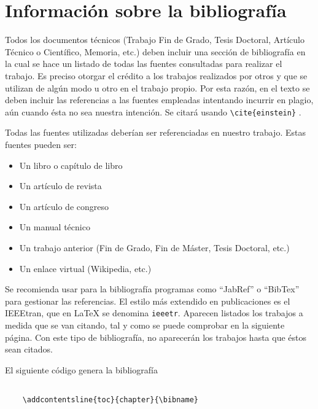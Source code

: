 \chapter*{Información sobre la bibliografía}
Todos los documentos técnicos (Trabajo Fin de Grado, Tesis Doctoral, Artículo Técnico o Científico, Memoria, etc.) deben incluir una sección de bibliografía en la cual se hace un listado de todas las fuentes consultadas para realizar el trabajo. Es preciso otorgar el crédito a los trabajos realizados por otros y que se utilizan de algún modo u otro en el trabajo propio. Por esta razón, en el texto se deben incluir las referencias a las fuentes empleadas intentando incurrir en plagio, aún cuando ésta no sea nuestra intención. Se citará usando \lstinline!\cite{einstein}! \cite{einstein}.


Todas las fuentes utilizadas deberían ser referenciadas en nuestro trabajo. Estas fuentes pueden ser:

\begin{itemize}
	\item Un libro o capítulo de libro
	\item Un artículo de revista
	\item Un artículo de congreso
	\item Un manual técnico
	\item Un trabajo anterior (Fin de Grado, Fin de Máster, Tesis Doctoral, etc.)
	\item Un enlace virtual (Wikipedia, etc.)
\end{itemize}

Se recomienda usar para la bibliografía programas como ``JabRef'' o ``BibTex'' para gestionar las referencias. El estilo más extendido en publicaciones es el IEEEtran, que en \LaTeX $ $ se denomina \texttt{ieeetr}. Aparecen listados los trabajos a medida que se van citando, tal y como se puede comprobar \cite{knuthwebsite} en la siguiente página. Con este tipo de bibliografía, no aparecerán los trabajos hasta que éstos sean citados.

El siguiente código genera la bibliografía
\begin{lstlisting}
	
	\addcontentsline{toc}{chapter}{\bibname}
	  
\end{lstlisting}
